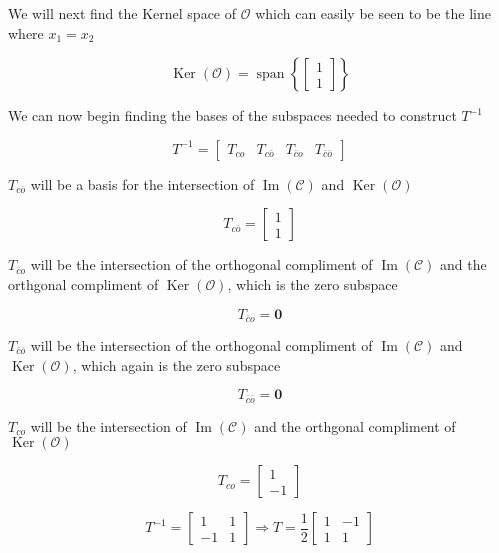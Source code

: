 \documentclass{article}
\begin{document}
\begin{enumerate}[label=\alph*)]
We will next find the Kernel space of $\mathcal{O}$ which can easily be seen to be the line where $x_1 = x_2$

\[
    \operatorname{Ker}(\mathcal{O}) = \operatorname{span}
    \left\{
        \begin{bmatrix}
            1 \\
            1
        \end{bmatrix}
    \right\}
\]

We can now begin finding the bases of the subspaces needed to construct $T^{-1}$

\[
T^{-1} = 
\begin{bmatrix}
    T_{c o} & T_{c \bar o} & T_{\bar c o} & T_{\bar c \bar o}
\end{bmatrix}
\]

$T_{c \bar o}$ will be a basis for the intersection of $\operatorname{Im}(\mathcal{C})$ and $\operatorname{Ker}(\mathcal{O})$

\[
T_{c \bar o} = 
\begin{bmatrix}
    1 \\
    1
\end{bmatrix}
\]

$T_{\bar c o}$ will be the intersection of the orthogonal compliment of $\operatorname{Im}(\mathcal{C})$ and the orthgonal compliment of $\operatorname{Ker}(\mathcal{O})$, which is the zero subspace

\[
T_{\bar c o} = \mathbf{0}
\]

$T_{\bar c \bar o}$ will be the intersection of the orthogonal compliment of $\operatorname{Im}(\mathcal{C})$ and $\operatorname{Ker}(\mathcal{O})$, which again is the zero subspace

\[
T_{\bar c \bar o} = \mathbf{0}
\]

$T_{c o}$ will be the intersection of $\operatorname{Im}(\mathcal{C})$ and the orthgonal compliment of $\operatorname{Ker}(\mathcal{O})$

\[
T_{c o} = 
\begin{bmatrix}
    1 \\
    -1
\end{bmatrix}
\]

\[
T^{-1} = 
\begin{bmatrix}
    1 & 1 \\
    -1 & 1
\end{bmatrix}
\Rightarrow
T = 
\frac{1}{2}
\begin{bmatrix}
    1 & -1 \\
    1 & 1
\end{bmatrix}
\]


\end{enumerate}
\end{document}
